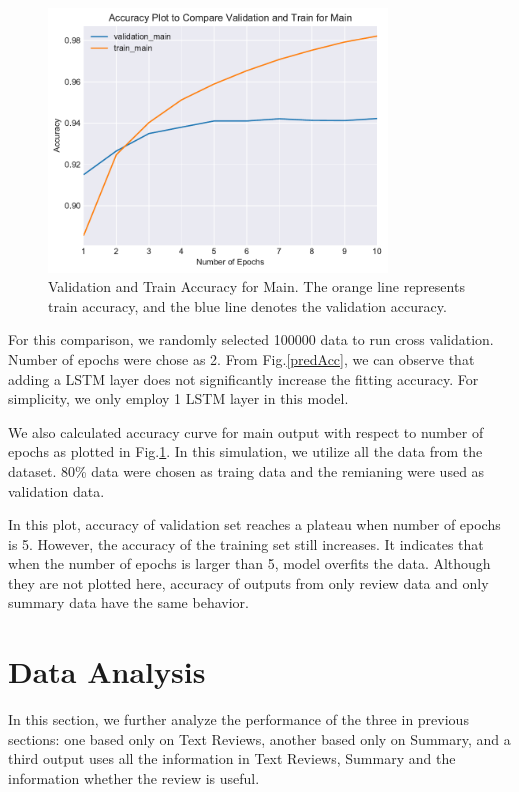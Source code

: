 \documentclass[letterpaper]{article} %
\begin{document}
\begin{figure}[!h]
\centering
\includegraphics[height=7cm,width=0.9\columnwidth]{report/train_val_main.pdf}  
\caption{Validation and Train Accuracy for Main. The orange line represents train accuracy, and the blue line denotes the validation accuracy.}
\label{epochs}
\end{figure}


For this comparison, we randomly selected 100000 data to run cross validation. Number of epochs were chose as 2. From Fig.\ref{predAcc}, we can observe that adding a LSTM layer does not significantly increase the fitting accuracy. For simplicity, we only employ 1 LSTM layer in this model.

We also calculated accuracy curve for main output with respect to number of epochs as plotted in Fig.\ref{epochs}. In this simulation, we utilize all the data from the dataset. 80\% data were chosen as traing data and the remianing were used as validation data.








In this plot, accuracy of validation set reaches a plateau when number of epochs is 5. However, the accuracy of the training set still increases. It indicates that when the number of epochs is larger than 5, model overfits the data. Although they are not plotted here, accuracy of outputs from only review data and only summary data have the same behavior. 

\section{Data Analysis}

In this section, we further analyze the performance of the three in previous sections: one based only on Text Reviews, another based only on Summary, and a third output uses all the information in Text Reviews, Summary and  the information whether the review is useful. 
\end{document}
